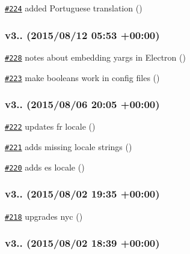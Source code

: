 \begin{DoxyItemize}
\item \href{https://github.com/bcoe/yargs/pull/224}{\tt \#224} added Portuguese translation ()
\end{DoxyItemize}

\subsubsection*{v3.. (2015/08/12 05\+:53 +00\+:00)}


\begin{DoxyItemize}
\item \href{https://github.com/bcoe/yargs/pull/228}{\tt \#228} notes about embedding yargs in Electron ()
\item \href{https://github.com/bcoe/yargs/pull/223}{\tt \#223} make booleans work in config files ()
\end{DoxyItemize}

\subsubsection*{v3.. (2015/08/06 20\+:05 +00\+:00)}


\begin{DoxyItemize}
\item \href{https://github.com/bcoe/yargs/pull/222}{\tt \#222} updates fr locale ()
\item \href{https://github.com/bcoe/yargs/pull/221}{\tt \#221} adds missing locale strings ()
\item \href{https://github.com/bcoe/yargs/pull/220}{\tt \#220} adds es locale ()
\end{DoxyItemize}

\subsubsection*{v3.. (2015/08/02 19\+:35 +00\+:00)}


\begin{DoxyItemize}
\item \href{https://github.com/bcoe/yargs/pull/218}{\tt \#218} upgrades nyc ()
\end{DoxyItemize}

\subsubsection*{v3.. (2015/08/02 18\+:39 +00\+:00)}



